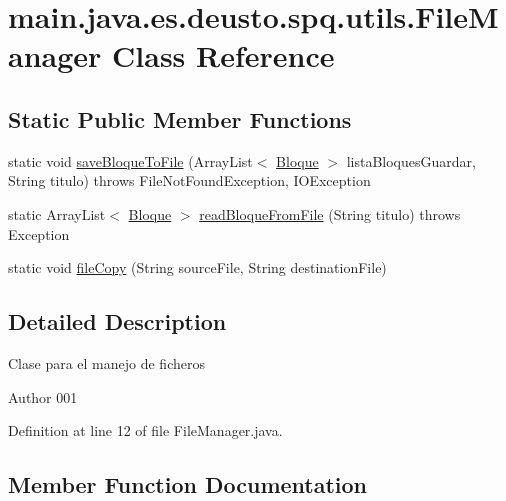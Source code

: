 \hypertarget{classmain_1_1java_1_1es_1_1deusto_1_1spq_1_1utils_1_1_file_manager}{}\section{main.\+java.\+es.\+deusto.\+spq.\+utils.\+File\+Manager Class Reference}
\label{classmain_1_1java_1_1es_1_1deusto_1_1spq_1_1utils_1_1_file_manager}
\subsection*{Static Public Member Functions}
\begin{DoxyCompactItemize}
\item 
static void \hyperlink{classmain_1_1java_1_1es_1_1deusto_1_1spq_1_1utils_1_1_file_manager_aaa99c5afe5162e5964859f6caf95cbae}{save\+Bloque\+To\+File} (Array\+List$<$ \hyperlink{classmain_1_1java_1_1es_1_1deusto_1_1spq_1_1data_1_1_bloque}{Bloque} $>$ lista\+Bloques\+Guardar, String titulo)  throws File\+Not\+Found\+Exception, I\+O\+Exception 
\item 
static Array\+List$<$ \hyperlink{classmain_1_1java_1_1es_1_1deusto_1_1spq_1_1data_1_1_bloque}{Bloque} $>$ \hyperlink{classmain_1_1java_1_1es_1_1deusto_1_1spq_1_1utils_1_1_file_manager_a202c7743f2fb4b3d2bfc1cd2cafdd06e}{read\+Bloque\+From\+File} (String titulo)  throws Exception 
\item 
static void \hyperlink{classmain_1_1java_1_1es_1_1deusto_1_1spq_1_1utils_1_1_file_manager_ae5e7b717e8cc0c81f3109c702f10ff40}{file\+Copy} (String source\+File, String destination\+File)
\end{DoxyCompactItemize}


\subsection{Detailed Description}
Clase para el manejo de ficheros \begin{DoxyAuthor}{Author}
001 
\end{DoxyAuthor}


Definition at line 12 of file File\+Manager.\+java.



\subsection{Member Function Documentation}
